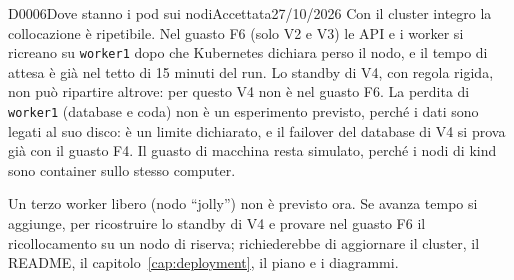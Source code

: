 \begin{decisione}{D0006}{Dove stanno i pod sui nodi}{Accettata}{27/10/2026}
\conseguenze
Con il cluster integro la collocazione è ripetibile. Nel guasto F6 (solo V2 e V3) le API e i worker si ricreano su \texttt{worker1} dopo che Kubernetes dichiara perso il nodo, e il tempo di attesa è già nel tetto di 15 minuti del run. Lo standby di V4, con regola rigida, non può ripartire altrove: per questo V4 non è nel guasto F6. La perdita di \texttt{worker1} (database e coda) non è un esperimento previsto, perché i dati sono legati al suo disco: è un limite dichiarato, e il failover del database di V4 si prova già con il guasto F4. Il guasto di macchina resta simulato, perché i nodi di kind sono container sullo stesso computer.

Un terzo worker libero (nodo ``jolly'') non è previsto ora. Se avanza tempo si aggiunge, per ricostruire lo standby di V4 e provare nel guasto F6 il ricollocamento su un nodo di riserva; richiederebbe di aggiornare il cluster, il README, il capitolo~\ref{cap:deployment}, il piano e i diagrammi.

\end{decisione}

